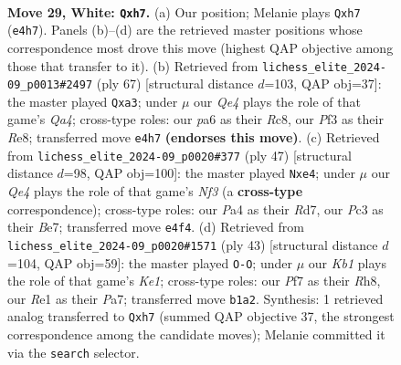 \documentclass[11pt]{article}
\begin{document}
\clearpage

\begin{figure}[p]\centering
\begin{subfigure}{0.46\textwidth}\centering
\resizebox{\linewidth}{!}{%
\newchessgame
\chessboard[
  setfen={1rb2k2/3qrP1p/ppn5/2p1p1p1/P3Q3/2P2P2/6PP/1KN1RBNR w - - 1 29},
  showmover=false,
  pgfstyle=straightmove, color=movearrow, markmove={e4-h7}
]}
\caption{}
\end{subfigure}\hfill
\begin{subfigure}{0.46\textwidth}\centering
\resizebox{\linewidth}{!}{%
\newchessgame
\chessboard[
  setfen={k1r1r3/p7/1p1b1pp1/q2Pn2p/3NP3/PQ4PP/4R1K1/BR6 b - - 1 34},
  showmover=false,
  pgfstyle=straightmove, color=movearrow, markmove={a5-a3}
]}
\caption{}
\end{subfigure}
\\[4pt]
\begin{subfigure}{0.46\textwidth}\centering
\resizebox{\linewidth}{!}{%
\newchessgame
\chessboard[
  setfen={2r3k1/p2rbpp1/Ppq1pn1p/8/1PPpN2P/3Q4/3B1PP1/2R1R1K1 b - - 2 24},
  showmover=false,
  pgfstyle=straightmove, color=movearrow, markmove={f6-e4}
]}
\caption{}
\end{subfigure}\hfill
\begin{subfigure}{0.46\textwidth}\centering
\resizebox{\linewidth}{!}{%
\newchessgame
\chessboard[
  setfen={4k2r/p3n2p/bqprp3/6P1/2P2p2/2Q2K2/PP2BNPP/1R5R b k - 1 22},
  showmover=false,
  pgfstyle=straightmove, color=movearrow, markmove={e8-g8}
]}
\caption{}
\end{subfigure}
\caption{\textbf{Move 29, White: \texttt{Qxh7}.} (a) Our position; Melanie plays \texttt{Qxh7} (\texttt{e4h7}). Panels (b)--(d) are the retrieved master positions whose correspondence most drove this move (highest QAP objective among those that transfer to it). (b) Retrieved from \texttt{lichess\_elite\_2024-09\_p0013\#2497} (ply 67) [structural distance $d$=103, QAP obj=37]: the master played \texttt{Qxa3}; under $\mu$ our \emph{Qe4} plays the role of that game's \emph{Qa4}; cross-type roles: our \emph{p}a6 as their \emph{R}c8, our \emph{P}f3 as their \emph{R}e8; transferred move \texttt{e4h7} \textbf{(endorses this move)}. (c) Retrieved from \texttt{lichess\_elite\_2024-09\_p0020\#377} (ply 47) [structural distance $d$=98, QAP obj=100]: the master played \texttt{Nxe4}; under $\mu$ our \emph{Qe4} plays the role of that game's \emph{Nf3} (a \textbf{cross-type} correspondence); cross-type roles: our \emph{P}a4 as their \emph{R}d7, our \emph{P}c3 as their \emph{B}e7; transferred move \texttt{e4f4}. (d) Retrieved from \texttt{lichess\_elite\_2024-09\_p0020\#1571} (ply 43) [structural distance $d$=104, QAP obj=59]: the master played \texttt{O-O}; under $\mu$ our \emph{Kb1} plays the role of that game's \emph{Ke1}; cross-type roles: our \emph{P}f7 as their \emph{R}h8, our \emph{R}e1 as their \emph{P}a7; transferred move \texttt{b1a2}. Synthesis: 1 retrieved analog transferred to \texttt{Qxh7} (summed QAP objective 37, the strongest correspondence among the candidate moves); Melanie committed it via the \texttt{search} selector.}
\label{fig:thought-m56}
\end{figure}
\end{document}
